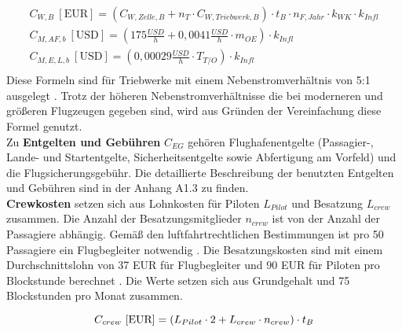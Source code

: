 \begin{equation}
   \begin{split}
   {C_{W,B} ~[\text{EUR}]} = (C_{W,Zelle,B} + n_{T} \cdot C_{W,Triebwerk,B} ) \cdot t_{B} \cdot n_{F, Jahr} \cdot k_{WK} \cdot k_{Infl}\\
%
   {C_{M,AF,b} ~[\text{USD}]} = (175 \frac{USD}{h} + 0,0041 \frac{USD}{h} \cdot m_{OE} )\cdot k_{Infl}\\
%
   {C_{M,E,L,b} ~[\text{USD}]} = (0,00029 \frac{USD}{h} \cdot T_{T/O} )\cdot k_{Infl}\\
   \label{maintenance}
   \end{split}
\end{equation}
%
Diese Formeln sind für Triebwerke mit einem Nebenstromverhältnis von 5:1 ausgelegt \cite{bruge2018wartungskosten}. %
Trotz der höheren Nebenstromverhältnisse die bei moderneren und größeren Flugzeugen gegeben sind,
wird aus Gründen der Vereinfachung diese Formel genutzt.\\
%
%

Zu \textbf{Entgelten und Gebühren} $C_{EG}$ gehören Flughafenentgelte 
(Passagier-, Lande- und Startentgelte, Sicherheitsentgelte sowie Abfertigung am Vorfeld)
und die Flugsicherungsgebühr. 
Die detaillierte Beschreibung der benutzten Entgelten und Gebühren sind in der Anhang A1.3 zu finden.\\ %

\textbf{Crewkosten} setzen sich aus Lohnkosten für Piloten $L_{Pilot}$ und Besatzung $L_{crew}$ zusammen. 
Die Anzahl der Besatzungsmitglieder $n_{crew}$ ist von der Anzahl der Passagiere abhängig. 
Gemäß den luftfahrtrechtlichen Bestimmungen ist pro 50 Passagiere ein Flugbegleiter notwendig \cite{conrady2019luftverkehr}.
Die Besatzungskosten sind mit einem Durchschnittslohn von 37 EUR für Flugbegleiter 
und 90 EUR für Piloten pro Blockstunde berechnet \cite{discover_airlines_cabin}.
Die Werte setzen sich aus Grundgehalt und 75 Blockstunden pro Monat zusammen.

\begin{equation}
   {C_{crew} ~[\text{EUR}]} = ({L}_{Pilot} \cdot 2 + {L}_{crew} \cdot n_{crew} ) \cdot t_{B} \\
   \label{crew cost}
\end{equation}


